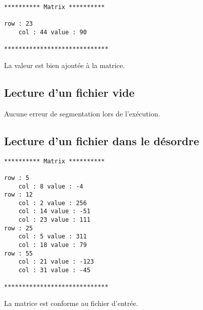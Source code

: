 \documentclass[12pt]{report}
\begin{document}




\begin{lstlisting}[caption=Sortie]
********** Matrix **********

row : 23
    col : 44 value : 90

*****************************
\end{lstlisting}

La valeur est bien ajoutée à la matrice.

\subsection{Lecture d'un fichier vide}



Aucune erreur de segmentation lors de l'exécution.

\subsection{Lecture d'un fichier dans le désordre}





\begin{lstlisting}[caption=Sortie]
    ********** Matrix **********

row : 5
    col : 8 value : -4
row : 12
    col : 2 value : 256
    col : 14 value : -51
    col : 23 value : 111
row : 25
    col : 5 value : 311
    col : 18 value : 79
row : 55
    col : 21 value : -123
    col : 31 value : -45

*****************************
\end{lstlisting}

La matrice est conforme au fichier d'entrée.
\end{document}
